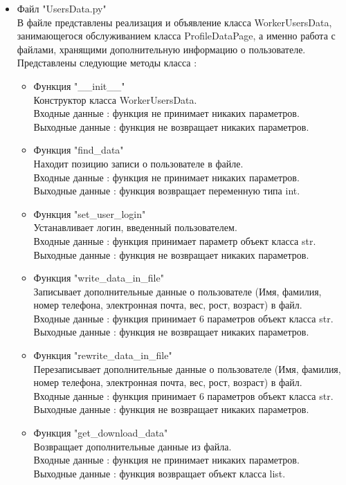 \documentclass[a4document]{article}
\begin{document}
{\begin{itemize}
    \item Файл "UsersData.py" \\
        В файле представлены реализация и объявление класса WorkerUsersData, занимающегося обслуживанием класса ProfileDataPage, а 
        именно работа с файлами, хранящими дополнительную информацию о пользователе.
        Представлены следующие методы класса :
        \begin{itemize}
            \item Функция "\_\_init\_\_" \\
                Конструктор класса WorkerUsersData.\\
                Входные данные : функция не принимает никаких параметров. \\ 
                Выходные данные : функция не возвращает никаких параметров.
            \item Функция "find\_data" \\
                Находит позицию записи о пользователе в файле.\\
                Входные данные : функция не принимает никаких параметров. \\ 
                Выходные данные : функция возвращает переменную типа int.
            \item Функция "set\_user\_login" \\
                Устанавливает логин, введенный пользователем. \\
                Входные данные : функция принимает параметр объект класса str. \\ 
                Выходные данные : функция не возвращает никаких параметров.
            \item Функция "write\_data\_in\_file" \\
                Записывает дополнительные данные о пользователе (Имя, фамилия, номер телефона, электронная почта,
                вес, рост, возраст) в файл. \\
                Входные данные : функция принимает 6 параметров объект класса str. \\ 
                Выходные данные : функция не возвращает никаких параметров.
            \item Функция "rewrite\_data\_in\_file" \\
                Перезаписывает дополнительные данные о пользователе (Имя, фамилия, номер телефона, электронная почта,
                вес, рост, возраст) в файл. \\
                Входные данные : функция принимает 6 параметров объект класса str. \\ 
                Выходные данные : функция не возвращает никаких параметров.
            \item Функция "get\_download\_data" \\
                Возвращает дополнительные данные из файла.\\
                Входные данные : функция не принимает никаких параметров. \\
                Выходные данные : функция возвращает объект класса list.
                

\end{itemize}
\end{itemize}}
\end{document}
